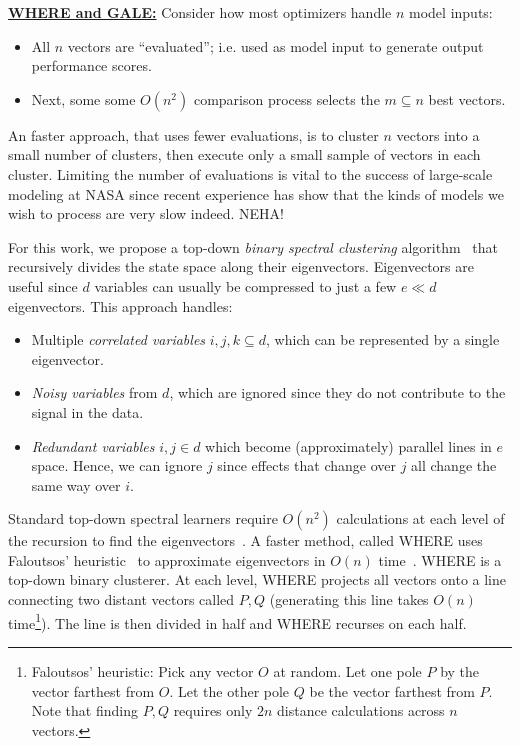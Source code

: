 \documentclass[12pt]{article}
\newcommand{\bi}{\begin{itemize}[leftmargin=0.7cm]}
\newcommand{\ei}{\end{itemize}}
\begin{document}
\underline{{\bf WHERE and GALE:}} 
Consider 
how most optimizers handle  $n$ model inputs:
\bi
\item
 All $n$ vectors are ``evaluated''; i.e. used as model input to
 generate   output performance scores. 
\item
Next, some   some $O(n^2)$ comparison process  selects the $m \subseteq n$ best vectors.
\ei
An faster approach, that uses fewer evaluations, is to cluster $n$ vectors
into a small number of clusters, then
 execute only a small sample of vectors in each cluster.
 Limiting the number of evaluations is vital to the success of large-scale modeling
 at NASA since recent experience has show that the kinds of models we wish to process
 are very slow indeed. NEHA!
 
 
For this work, we propose a top-down  {\em binary spectral clustering} algorithm~\cite{kamvar03} 
that recursively divides
the state space along their eigenvectors. Eigenvectors are useful since 
  $d$ variables can usually be compressed to just
  a few $e \ll d$ eigenvectors. This approach handles:
\bi
\item
Multiple {\em correlated variables} $i,j,k \subseteq d$, which can be represented
by a single  eigenvector.
\item
{\em Noisy variables} from $d$, which are 
ignored since they  do not contribute to the signal in the data.
\item
{\em Redundant  variables} \mbox{$i,j \in d$} which become (approximately) parallel lines
in $e$ space. Hence, we 
can ignore $j$ 
since effects that change over $j$ all
change   the same way over $i$.
\ei
Standard top-down spectral learners require  $O(n^2)$ calculations at each level 
of the recursion to find the eigenvectors~\cite{boley98}. A faster method, called WHERE 
uses Faloutsos'  heuristic~\cite{Faloutsos1995} to
approximate eigenvectors   in $O(n)$ time~\cite{platt05}.
WHERE  is a top-down binary clusterer.  
At each level, WHERE  projects all  vectors onto a line connecting two distant vectors called $P,Q$ (generating this line takes $O(n)$ time\footnote{Faloutsos’ heuristic: Pick any vector $O$ at random. Let one pole $P$ by the
vector farthest from $O$. Let the other pole $Q$ be the vector farthest from $P$. Note that
finding $P,Q$ requires only $2n$ distance calculations across $n$ vectors.}).
The line is then divided in half
and WHERE recurses on each half. 
\end{document}
